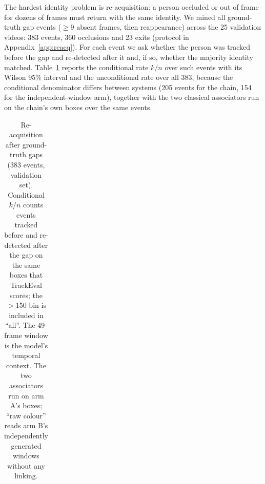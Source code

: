\documentclass{article} %
\begin{document}
The hardest identity problem is re-acquisition: a person occluded or out of frame for
dozens of frames must return with the same identity. We mined all ground-truth gap events
($\geq$9 absent frames, then reappearance) across the 25 validation videos: 383 events, 360
occlusions and 23 exits (protocol in Appendix~\ref{app:reacq}). For each event we ask
whether the person was tracked before the gap and re-detected after it and, if so,
whether the majority identity matched. Table~\ref{tab:reacq} reports the conditional rate
$k/n$ over such events with its Wilson 95\% interval and the unconditional rate over all
383, because the conditional denominator differs between systems (205 events for the chain,
154 for the independent-window arm), together with the two classical associators run on
the chain's own boxes over the same events.

\begin{table}[t]
\caption{Re-acquisition after ground-truth gaps (383 events, validation set). Conditional
$k/n$ counts events tracked before and re-detected after the gap on the same boxes that
TrackEval scores; the $>$150 bin is included in ``all''. The 49-frame window is the model's
temporal context. The two associators run on arm A's boxes; ``raw colour'' reads arm B's
independently generated windows without any linking.}
\label{tab:reacq}
\begin{center}
\scriptsize
\setlength{\tabcolsep}{3pt}
\begin{tabular}{lccccc}
\toprule

\end{tabular}
\end{center}
\end{table}
\end{document}
